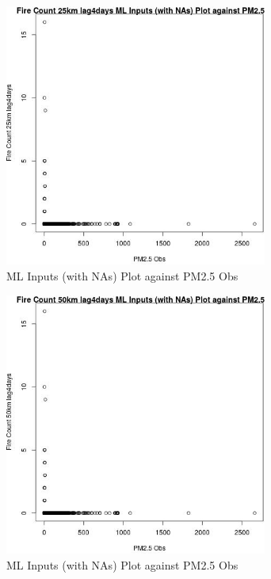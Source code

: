 \begin{figure} 
\centering  
\includegraphics[width=0.77\textwidth]{Code_Outputs/Report_ML_input_PM25_Step4_part_e_de_duplicated_aves_compiled_2019-05-21wNAs_Fire_Count_25km_lag4daysvPM25_Obs.jpg} 
\caption{\label{fig:Report_ML_input_PM25_Step4_part_e_de_duplicated_aves_compiled_2019-05-21wNAsFire_Count_25km_lag4daysvPM25_Obs}ML Inputs (with NAs) Plot against PM2.5 Obs} 
\end{figure} 
 

\begin{figure} 
\centering  
\includegraphics[width=0.77\textwidth]{Code_Outputs/Report_ML_input_PM25_Step4_part_e_de_duplicated_aves_compiled_2019-05-21wNAs_Fire_Count_50km_lag4daysvPM25_Obs.jpg} 
\caption{\label{fig:Report_ML_input_PM25_Step4_part_e_de_duplicated_aves_compiled_2019-05-21wNAsFire_Count_50km_lag4daysvPM25_Obs}ML Inputs (with NAs) Plot against PM2.5 Obs} 
\end{figure} 
 

